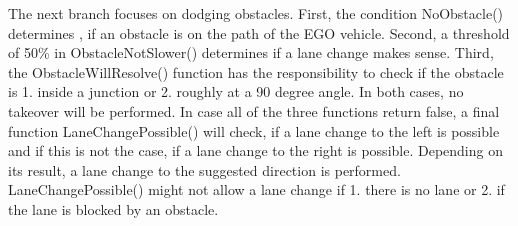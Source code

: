 The next branch focuses on dodging obstacles. First, the condition NoObstacle() determines , if an obstacle is on the path of the EGO vehicle. Second, a threshold of 50\% in ObstacleNotSlower() determines if a lane change makes sense. Third, the ObstacleWillResolve() function has the responsibility to check if the obstacle is 1. inside a junction or 2. roughly at a 90 degree angle. In both cases, no takeover will be performed. In case all of the three functions return false, a final function LaneChangePossible() will check, if a lane change to the left is possible and if this is not the case, if a lane change to the right is possible. Depending on its result, a lane change to the suggested direction is performed. LaneChangePossible() might not allow a lane change if 1. there is no lane or 2. if the lane is blocked by an obstacle.


